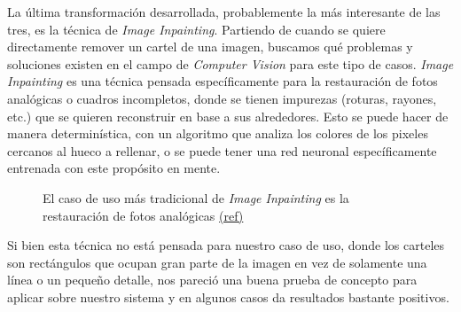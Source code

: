 \documentclass[a4paper]{article}
\begin{document}
La última transformación desarrollada, probablemente la más interesante de las tres, es la técnica de \textit{Image Inpainting}. Partiendo de cuando se quiere directamente remover un cartel de una imagen, buscamos qué problemas y soluciones existen en el campo de \textit{Computer Vision} para este tipo de casos. \textit{Image Inpainting} es una técnica pensada específicamente para la restauración de fotos analógicas o cuadros incompletos, donde se tienen impurezas (roturas, rayones, etc.) que se quieren reconstruir en base a sus alrededores. Esto se puede hacer de manera determinística, con un algoritmo que analiza los colores de los pixeles cercanos al hueco a rellenar, o se puede tener una red neuronal específicamente entrenada con este propósito en mente.

\begin{figure}[H]
\caption{El caso de uso más tradicional de \textit{Image Inpainting} es la restauración de fotos analógicas \scriptsize{\href{https://pyimagesearch.com/2020/05/18/image-inpainting-with-opencv-and-python/}{(ref)}}}
\end{figure}

Si bien esta técnica no está pensada para nuestro caso de uso, donde los carteles son rectángulos que ocupan gran parte de la imagen en vez de solamente una línea o un pequeño detalle, nos pareció una buena prueba de concepto para aplicar sobre nuestro sistema y en algunos casos da resultados bastante positivos.
\end{document}

